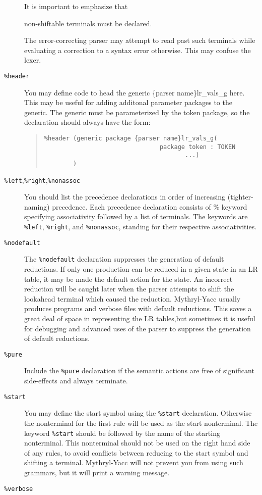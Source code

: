 \begin{description}
It is important to emphasize that
\begin{em}
non-shiftable terminals must be declared.
\end{em}
The error-correcting parser may attempt to read past such terminals
while evaluating a correction to a syntax error otherwise.  This may
confuse the lexer.
\item[{\tt \%header}]
You may define code to head the generic \{parser name\}lr_vals_g here.  This
may be useful for adding additonal parameter packages to the generic.
The generic must be parameterized by the token package, so
the declaration should always have the form:
\begin{quote}
\begin{verbatim}
%header (generic package {parser name}lr_vals_g(
                                package token : TOKEN
                                       ...) 
        )
\end{verbatim}
\end{quote}

\item[{\tt \%left},{\tt \%right},{\tt \%nonassoc}]
You should list the precedence declarations in order of increasing (tighter-naming)
precedence.  Each precedence declaration consists
of \% keyword specifying associativity followed by a list of terminals.
The keywords are {\tt \%left}, {\tt \%right}, and {\tt \%nonassoc},
standing for their respective associativities.
\item[{\tt \%nodefault}]
The {\tt \%nodefault} declaration suppresses the generation of default
reductions.  If only one production can be reduced in a given state in
an LR table, it may be made the default action for the state.  An incorrect
reduction will be caught later when the parser attempts to shift the lookahead
terminal which caused the reduction. Mythryl-Yacc usually produces programs and
verbose files with default reductions.  This saves a great deal of
space in representing the LR tables,but
sometimes it is useful for debugging and advanced
uses of the parser to suppress the generation of default reductions.
\item[{\tt \%pure}]
Include the {\tt \%pure} declaration if the semantic actions
are free of significant side-effects and always terminate.
\item[{\tt \%start}]
You may define the start symbol using
the {\tt \%start} declaration.  Otherwise the nonterminal for the
first rule will be used as the start nonterminal.
The keyword {\tt \%start} should be followed by the name of the starting
nonterminal.  This nonterminal should not be used on the right hand
side of any rules, to avoid conflicts between reducing to the start
symbol and shifting a terminal.  Mythryl-Yacc will not prevent you
from using such grammars, but it will print a warning message.
\item[{\tt \%verbose}]


\end{description}

